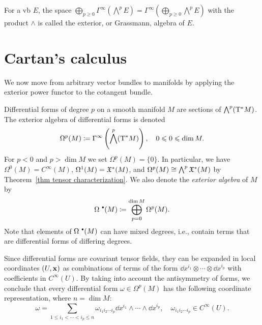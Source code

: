 \begin{defn}
For a \gls{vb} $E$, the space $\bigoplus_{p\geq 0}\Gamma^\infty(\bigwedge^p E)=\Gamma^\infty\left(\bigoplus_{p\geq 0}\bigwedge^p E\right)$ with the product $\wedge$ is called the exterior, or Grassmann, algebra of $E$.
\end{defn}







\section{Cartan's calculus}

We now move from arbitrary vector bundles to manifolds by applying the exterior power functor to the cotangent bundle.

\begin{defn}
    Differential forms of degree $p$ on a smooth manifold $M$ are sections of $\bigwedge^p (\T^\ast M)$. The exterior algebra of differential forms is denoted
    \[\Omega^p(M)\coloneqq \Gamma^\infty\left(\bigwedge^p(\T^\ast M)\right),\quad 0\leq 0\leq\dim M.\]
    For $p<0$ and $p>\dim M$ we set $\Omega^p(M)=\{0\}$.
    In particular, we have $\Omega^0(M)=C^\infty(M)$, $\Omega^1(M)=\fX^\ast (M)$, and $\Omega^p(M)\cong \bigwedge^p \fX^\ast(M)$ by Theorem~\ref{thm tensor characterization}. We also denote the \emph{exterior algebra} of $M$ by
    \[\Omega^{\smbullet}(M)\coloneq\bigoplus_{p=0}^{\dim M} \Omega^p(M).\]
    Note that elements of $\Omega^{\smbullet}(M)$ can have mixed degrees, i.e., contain terms that are differential forms of differing degrees.
\end{defn}


\begin{rem}
    Since differential forms are covariant tensor fields, they can be expanded in local coordinates $(U,\bf{x})$ as combinations of terms of the form $\dd x^{i_1}\otimes\cdots\otimes \dd x^{i_p}$ with coefficients in $C^\infty(U)$. By taking into account the antisymmetry of forms, we conclude that every differential form $\omega\in\Omega^p(M)$ has the following coordinate representation, where $n=\dim M$:
    \[\omega=\sum_{1\leq i_1<\cdots <i_p\leq n}\omega_{i_1 i_2\cdots i_p}\dd x^{i_1}\wedge\cdots\wedge \dd x^{i_p},\quad \omega_{i_1 i_2\cdots i_p}\in C^\infty(U).\label{eq local rep of a p-form}\]
\end{rem}


